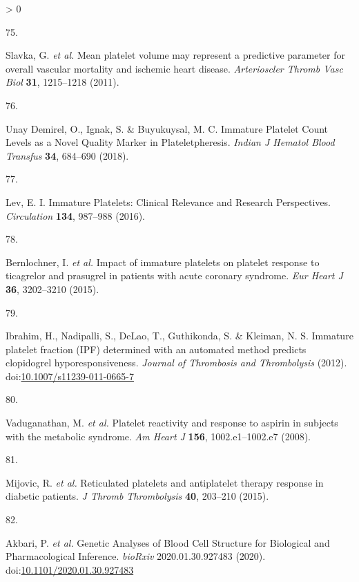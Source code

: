 \documentclass[11pt,twoside]{bristolthesis}
\newlength{\cslhangindent}
\newlength{\csllabelwidth}
\newenvironment{CSLReferences}[2] %
 {%
  \setlength{\parindent}{0pt}
  \ifodd #1 \everypar{\setlength{\hangindent}{\cslhangindent}}\ignorespaces\fi
  \ifnum #2 > 0
  \setlength{\parskip}{#2\baselineskip}
  \fi
 }%
 {}
\newcommand{\CSLLeftMargin}[1]{\parbox[t]{\csllabelwidth}{#1}}
\newcommand{\CSLRightInline}[1]{\parbox[t]{\linewidth - \csllabelwidth}{#1}\break}
\begin{document}
\begin{CSLReferences}{0}{0}
\leavevmode\hypertarget{ref-Slavka2011}{}%
\CSLLeftMargin{75. }
\CSLRightInline{Slavka, G. \emph{et al.} {Mean platelet volume may represent a predictive parameter for overall vascular mortality and ischemic heart disease}. \emph{Arterioscler Thromb Vasc Biol} \textbf{31}, 1215--1218 (2011).}

\leavevmode\hypertarget{ref-UnayDemirel2018a}{}%
\CSLLeftMargin{76. }
\CSLRightInline{Unay Demirel, O., Ignak, S. \& Buyukuysal, M. C. {Immature Platelet Count Levels as a Novel Quality Marker in Plateletpheresis}. \emph{Indian J Hematol Blood Transfus} \textbf{34}, 684--690 (2018).}

\leavevmode\hypertarget{ref-Lev2016a}{}%
\CSLLeftMargin{77. }
\CSLRightInline{Lev, E. I. {Immature Platelets: Clinical Relevance and Research Perspectives}. \emph{Circulation} \textbf{134}, 987--988 (2016).}

\leavevmode\hypertarget{ref-Bernlochner2015a}{}%
\CSLLeftMargin{78. }
\CSLRightInline{Bernlochner, I. \emph{et al.} {Impact of immature platelets on platelet response to ticagrelor and prasugrel in patients with acute coronary syndrome}. \emph{Eur Heart J} \textbf{36}, 3202--3210 (2015).}

\leavevmode\hypertarget{ref-Ibrahim2012}{}%
\CSLLeftMargin{79. }
\CSLRightInline{Ibrahim, H., Nadipalli, S., DeLao, T., Guthikonda, S. \& Kleiman, N. S. {Immature platelet fraction (IPF) determined with an automated method predicts clopidogrel hyporesponsiveness}. \emph{Journal of Thrombosis and Thrombolysis} (2012). doi:\href{https://doi.org/10.1007/s11239-011-0665-7}{10.1007/s11239-011-0665-7}}

\leavevmode\hypertarget{ref-Vaduganathan2008a}{}%
\CSLLeftMargin{80. }
\CSLRightInline{Vaduganathan, M. \emph{et al.} {Platelet reactivity and response to aspirin in subjects with the metabolic syndrome}. \emph{Am Heart J} \textbf{156}, 1002.e1--1002.e7 (2008).}

\leavevmode\hypertarget{ref-Mijovic2015a}{}%
\CSLLeftMargin{81. }
\CSLRightInline{Mijovic, R. \emph{et al.} {Reticulated platelets and antiplatelet therapy response in diabetic patients}. \emph{J Thromb Thrombolysis} \textbf{40}, 203--210 (2015).}

\leavevmode\hypertarget{ref-Akbari2020}{}%
\CSLLeftMargin{82. }
\CSLRightInline{Akbari, P. \emph{et al.} {Genetic Analyses of Blood Cell Structure for Biological and Pharmacological Inference}. \emph{bioRxiv} 2020.01.30.927483 (2020). doi:\href{https://doi.org/10.1101/2020.01.30.927483}{10.1101/2020.01.30.927483}}


\end{CSLReferences}
\end{document}
